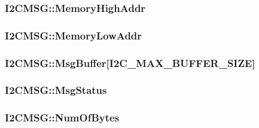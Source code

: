 \subsubsection[{Memory\+High\+Addr}]{ I2\+C\+M\+S\+G\+::\+Memory\+High\+Addr}\label{struct_i2_c_m_s_g_a64e5959ad9bcda0fe2c0aa5e13343461}
\hypertarget{struct_i2_c_m_s_g_a12bf2f3766ce5eea6eb15ee8af2fad47}{}
\subsubsection[{Memory\+Low\+Addr}]{ I2\+C\+M\+S\+G\+::\+Memory\+Low\+Addr}\label{struct_i2_c_m_s_g_a12bf2f3766ce5eea6eb15ee8af2fad47}
\hypertarget{struct_i2_c_m_s_g_a55a1f031763e58f89d5a6fb8b63a3aad}{}
\subsubsection[{Msg\+Buffer}]{ I2\+C\+M\+S\+G\+::\+Msg\+Buffer\mbox{[}{\bf I2\+C\+\_\+\+M\+A\+X\+\_\+\+B\+U\+F\+F\+E\+R\+\_\+\+S\+I\+Z\+E}\mbox{]}}\label{struct_i2_c_m_s_g_a55a1f031763e58f89d5a6fb8b63a3aad}
\hypertarget{struct_i2_c_m_s_g_a22d7285b8657bb4f0f338f986d3539c7}{}
\subsubsection[{Msg\+Status}]{ I2\+C\+M\+S\+G\+::\+Msg\+Status}\label{struct_i2_c_m_s_g_a22d7285b8657bb4f0f338f986d3539c7}
\hypertarget{struct_i2_c_m_s_g_a41dc94d544dabce8108488030a92da60}{}
\subsubsection[{Num\+Of\+Bytes}]{ I2\+C\+M\+S\+G\+::\+Num\+Of\+Bytes}\label{struct_i2_c_m_s_g_a41dc94d544dabce8108488030a92da60}
\hypertarget{struct_i2_c_m_s_g_a540fef1ef283511a75046b8dabbbac39}{}
